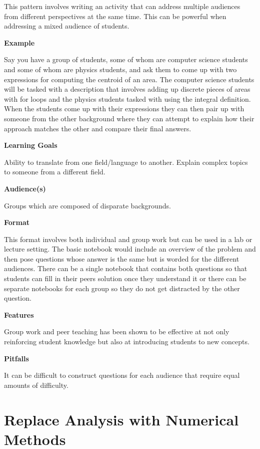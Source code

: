 \documentclass[]{book}
\begin{document}
This pattern involves writing an activity that can address multiple
audiences from different perspectives at the same time. This can be
powerful when addressing a mixed audience of students.

\textbf{Example}

Say you have a group of students, some of whom are computer science
students and some of whom are physics students, and ask them to come up
with two expressions for computing the centroid of an area. The computer
science students will be tasked with a description that involves adding
up discrete pieces of areas with for loops and the physics students
tasked with using the integral definition. When the students come up
with their expressions they can then pair up with someone from the other
background where they can attempt to explain how their approach matches
the other and compare their final answers.

\textbf{Learning Goals}

Ability to translate from one field/language to another. Explain complex
topics to someone from a different field.

\textbf{Audience(s)}

Groups which are composed of disparate backgrounds.

\textbf{Format}

This format involves both individual and group work but can be used in a
lab or lecture setting. The basic notebook would include an overview of
the problem and then pose questions whose answer is the same but is
worded for the different audiences. There can be a single notebook that
contains both questions so that students can fill in their peers
solution once they understand it or there can be separate notebooks for
each group so they do not get distracted by the other question.

\textbf{Features}

Group work and peer teaching has been shown to be effective at not only
reinforcing student knowledge but also at introducing students to new
concepts.

\textbf{Pitfalls}

It can be difficult to construct questions for each audience that
require equal amounts of difficulty.\\

\section{Replace Analysis with Numerical
Methods}\label{replace-analysis-with-numerical-methods}
\end{document}
